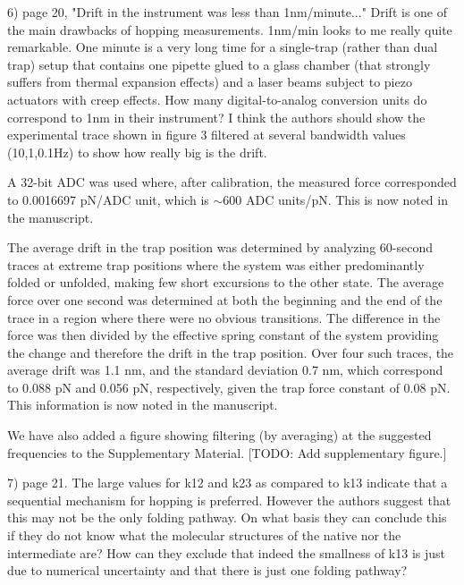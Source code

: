 \documentclass[ucb,qb3,10pt,fullfrom]{ucletter}
\begin{document}
\begin{letter}{}
\color{red}
6) page 20, "Drift in the instrument was less than 1nm/minute..." Drift is one of the main drawbacks of hopping measurements. 1nm/min looks to me really quite remarkable. One minute is a very long time for a single-trap (rather than dual trap) setup that contains one pipette glued to a glass chamber (that strongly suffers from thermal expansion effects) and a laser beams subject to piezo actuators with creep effects. How many digital-to-analog conversion units do correspond to 1nm in their instrument? I think the authors should show the experimental trace shown in figure 3 filtered at several bandwidth values (10,1,0.1Hz) to show how really big is the drift.
\color{black}

A 32-bit ADC was used where, after calibration, the measured force corresponded to 0.0016697 pN/ADC unit, which is $\sim$600 ADC units/pN.
This is now noted in the manuscript.

The average drift in the trap position was determined by analyzing 60-second traces at extreme trap positions where the system was either predominantly folded or unfolded, making few short excursions to the other state.  
The average force over one second was determined at both the beginning and the end of the trace in a region where there were no obvious transitions.  
The difference in the force was then divided by the effective spring constant of the system providing the change and therefore the drift in the trap position.  
Over four such traces, the average drift was 1.1 nm, and the standard deviation 0.7 nm, which correspond to 0.088 pN and 0.056 pN, respectively, given the trap force constant of 0.08 pN.
This information is now noted in the manuscript.

We have also added a figure showing filtering (by averaging) at the suggested frequencies to the Supplementary Material. 
{\color{blue} [TODO: Add supplementary figure.]}

\color{red}
7) page 21. The large values for k12 and k23 as compared to k13 indicate that a sequential mechanism for hopping is preferred. However the authors suggest that this may not be the only folding pathway. On what basis they can conclude this if they do not know what the molecular structures of the native nor the intermediate are? How can they exclude that indeed the smallness of k13 is just due to numerical uncertainty and that there is just one folding pathway?
\color{black}


\end{letter}
\end{document}
